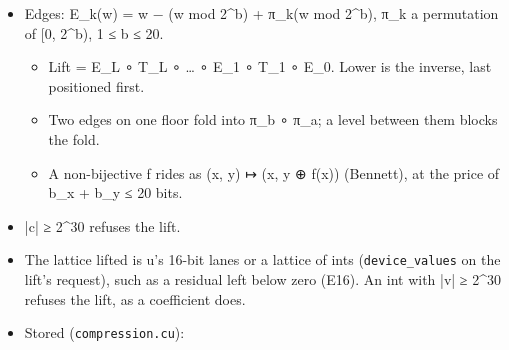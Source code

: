 \begin{itemize}
\begin{itemize}
\item target\_\allowbreak{}a ← target\_\allowbreak{}a + σ·⌊(r + Σ\_\allowbreak{}k w\_\allowbreak{}k·other\_\allowbreak{}\{a+o\_\allowbreak{}k\}) / 2\textasciicircum{}s⌋, σ = ±1, an index past either end of \texttt{other} taken at that end;
\item a ruleset R = (ρ\_\allowbreak{}1, …, ρ\_\allowbreak{}m) runs its steps in order along every line of every level. T⁻¹ runs them last first with each σ turned. A step moves only its target, reading only the other band, and every ruleset is therefore invertible exactly, whatever its weights;
\item the kernels' 5/3 is ρ\_\allowbreak{}1 = (H, σ = −1, o = (0, 1), w = (1, 1), r = 0, s = 1), then ρ\_\allowbreak{}2 = (L, σ = +1, o = (−1, 0), w = (1, 1), r = 2, s = 2);
\item two rulesets the kernels do not run are the S transform, (H, −1, (0), (1), 0, 0) then (L, +1, (0), (1), 0, 1), and a four-tap predict, (H, −1, (−1, 0, 1, 2), (−1, 9, 9, −1), 8, 4), with the 5/3's update;
\item on the record machine a weight other than ±1 is a PRODUCT by a constant, which keymath's linear forms carry (A16), and each constant is one step, positioned where it is first read.
\end{itemize}
\item Edges: E\_\allowbreak{}k(w) = w − (w mod 2\textasciicircum{}b) + π\_\allowbreak{}k(w mod 2\textasciicircum{}b), π\_\allowbreak{}k a permutation of [0, 2\textasciicircum{}b), 1 ≤ b ≤ 20.

\begin{itemize}
\item Lift = E\_\allowbreak{}L ∘ T\_\allowbreak{}L ∘ … ∘ E\_\allowbreak{}1 ∘ T\_\allowbreak{}1 ∘ E\_\allowbreak{}0. Lower is the inverse, last positioned first.
\item Two edges on one floor fold into π\_\allowbreak{}b ∘ π\_\allowbreak{}a; a level between them blocks the fold.
\item A non-bijective f rides as (x, y) ↦ (x, y ⊕ f(x)) (Bennett), at the price of b\_\allowbreak{}x + b\_\allowbreak{}y ≤ 20 bits.
\end{itemize}
\item |c| ≥ 2\textasciicircum{}30 refuses the lift.
\item The lattice lifted is u's 16-bit lanes or a lattice of ints (\texttt{device\_\allowbreak{}values} on the lift's request), such as a residual left below zero (E16). An int with |v| ≥ 2\textasciicircum{}30 refuses the lift, as a coefficient does.
\item Stored (\texttt{compression.\allowbreak{}cu}):


\end{itemize}
